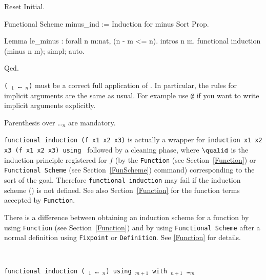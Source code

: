 \begin{coq_example*}
\begin{coq_eval}
Reset Initial.
\end{coq_eval}
\begin{coq_example}
Functional Scheme minus_ind := Induction for minus Sort Prop.

Lemma le_minus : forall n m:nat, (n - m <= n).
intros n m.
functional induction (minus n m); simpl; auto.
\end{coq_example}
\begin{coq_example*}
Qed.
\end{coq_example*}

\Rem \texttt{(\qualid\ \term$_1$ \dots\ \term$_n$)} must be a correct
full application of \qualid. In particular, the rules for implicit
arguments are the same as usual. For example use \texttt{@\qualid} if
you want to write implicit arguments explicitly.

\Rem Parenthesis over \qualid \dots \term$_n$ are mandatory.

\Rem \texttt{functional induction (f x1 x2 x3)} is actually a wrapper
for \texttt{induction x1 x2 x3 (f x1 x2 x3) using \qualid} followed by
a cleaning phase, where $\qualid$ is the induction principle
registered for $f$ (by the \texttt{Function} (see Section~\ref{Function})
or \texttt{Functional Scheme} (see Section~\ref{FunScheme}) command)
corresponding to the sort of the goal.  Therefore \texttt{functional
  induction} may fail if the induction scheme (\texttt{\qualid}) is
not defined. See also Section~\ref{Function} for the function terms
accepted by \texttt{Function}.

\Rem There is a difference between obtaining an induction scheme for a
function by using \texttt{Function} (see Section~\ref{Function}) and by
using \texttt{Functional Scheme} after a normal definition using
\texttt{Fixpoint} or \texttt{Definition}. See \ref{Function} for
details.

\SeeAlso{\ref{Function},\ref{FunScheme},\ref{FunScheme-examples},
  \ref{sec:functional-inversion}}

\begin{ErrMsgs}
\item {}

  ~

\item {}
\end{ErrMsgs}

\begin{Variants}
\item {\tt functional induction (\qualid\ \term$_1$ \dots\ \term$_n$)
   using \term$_{m+1}$ with {\term$_{n+1}$} \dots {\term$_m$}}


\end{Variants}
\end{coq_example*}
